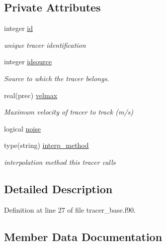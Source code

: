 \subsection*{Private Attributes}
\begin{DoxyCompactItemize}
\item 
integer \mbox{\hyperlink{structtracer__base__mod_1_1tracer__par__class_a659d37298b1c0a06c7627e33085eaf77}{id}}
\begin{DoxyCompactList}\small\item\em unique tracer identification \end{DoxyCompactList}\item 
integer \mbox{\hyperlink{structtracer__base__mod_1_1tracer__par__class_ad8fa9b92761b2a1f833d77c48adbb2b3}{idsource}}
\begin{DoxyCompactList}\small\item\em Source to which the tracer belongs. \end{DoxyCompactList}\item 
real(prec) \mbox{\hyperlink{structtracer__base__mod_1_1tracer__par__class_a58ad740d66f1c65d200ad7bd22fbcb77}{velmax}}
\begin{DoxyCompactList}\small\item\em Maximum velocity of tracer to track (m/s) \end{DoxyCompactList}\item 
logical \mbox{\hyperlink{structtracer__base__mod_1_1tracer__par__class_ae331d822841461c650cb0f3ebdf511b3}{noise}}
\item 
type(string) \mbox{\hyperlink{structtracer__base__mod_1_1tracer__par__class_a95251de762dbf5b8e29235c3d61a6e0e}{interp\+\_\+method}}
\begin{DoxyCompactList}\small\item\em interpolation method this tracer calls \end{DoxyCompactList}\end{DoxyCompactItemize}


\subsection{Detailed Description}


Definition at line 27 of file tracer\+\_\+base.\+f90.



\subsection{Member Data Documentation}
\mbox{\label{structtracer__base__mod_1_1tracer__par__class_a659d37298b1c0a06c7627e33085eaf77}} 
